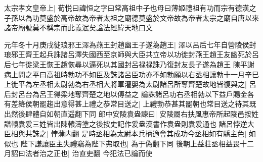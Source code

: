 太宗孝文皇帝上|{
	荀悦曰諱恒之字曰常高祖中子也母曰薄姬禮祖有功而宗有德漢之子孫以為功莫盛於高帝故為帝者太祖之廟德莫盛於文帝故為帝者太宗之廟自唐以來諸帝廟號莫不稱宗而此義泯矣諡法經緯天地曰文}


元年冬十月庚戌徙琅邪王澤為燕王封趙幽王子遂為趙王|{
	澤以呂后七年自營陵侯封琅邪王齊王起兵誅諸呂澤失國西至京師與大臣共立帝以功徙封燕王趙王友幽死於呂后七年徙梁王恢王趙恢尋以逼死以其國封呂禄禄誅乃復封友長子遂為趙王}
陳平謝病上問之平曰高祖時勃功不如臣及誅諸呂臣功亦不如勃願以右丞相讓勃十一月辛巳上徙平為左丞相太尉勃為右丞相大將軍灌嬰為太尉諸呂所奪齊楚故地皆復與之|{
	呂后封呂台為呂王得梁地奪齊楚之地以傅益之}
論誅諸呂功右丞相勃以下益戶賜金各有差絳侯朝罷趨出意得甚上禮之恭常目送之|{
	上禮勃恭甚其罷朝也常目送之待其既出然後肆體自如朝直遥翻下同}
郎中安陵袁盎諫曰|{
	安陵屬右扶風惠帝所起陵邑按姓譜轅袁爰三姓皆出陳轅濤塗之後按史記作爰盎漢書作袁盎則袁爰通也}
諸呂悖逆大臣相與共誅之|{
	悖蒲内翻}
是時丞相為太尉本兵柄適會其成功今丞相如有驕主色|{
	如似也}
陛下謙讓臣主失禮竊為陛下弗取也|{
	為于偽翻下同}
後朝上益莊丞相益畏十二月詔曰法者治之正也|{
	治直吏翻}
今犯法已論而使

